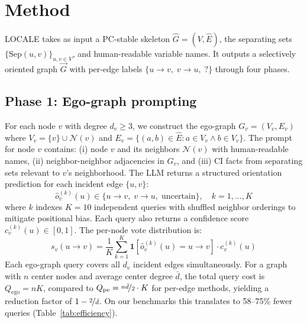 \documentclass{article}
\begin{document}
\section{Method}

LOCALE takes as input a PC-stable skeleton $\hat{G} = (V, \hat{E})$, the separating sets $\{\text{Sep}(u,v)\}_{u,v \in V}$, and human-readable variable names. It outputs a selectively oriented graph $\vec{G}$ with per-edge labels $\{u \to v, \; v \to u, \; ?\}$ through four phases.

\subsection{Phase 1: Ego-graph prompting}

For each node $v$ with degree $d_v \geq 3$, we construct the ego-graph $G_v = (V_v, E_v)$ where $V_v = \{v\} \cup \mathcal{N}(v)$ and $E_v = \{(a,b) \in \hat{E} : a \in V_v \wedge b \in V_v\}$. The prompt for node $v$ contains: (i) node $v$ and its neighbors $\mathcal{N}(v)$ with human-readable names, (ii) neighbor-neighbor adjacencies in $G_v$, and (iii) CI facts from separating sets relevant to $v$'s neighborhood. The LLM returns a structured orientation prediction for each incident edge $\{u, v\}$:
\begin{equation}
    \hat{o}_{v}^{(k)}(u) \in \{u \to v, \; v \to u, \; \text{uncertain}\}, \quad k = 1, \ldots, K
\end{equation}
where $k$ indexes $K{=}10$ independent queries with shuffled neighbor orderings to mitigate positional bias. Each query also returns a confidence score $c_{v}^{(k)}(u) \in [0,1]$. The per-node vote distribution is:
\begin{equation}
    s_v(u \to v) = \frac{1}{K} \sum_{k=1}^{K} \mathbf{1}[\hat{o}_{v}^{(k)}(u) = u \to v] \cdot c_{v}^{(k)}(u)
\end{equation}
Each ego-graph query covers all $d_v$ incident edges simultaneously. For a graph with $n$ center nodes and average center degree $\bar{d}$, the total query cost is $Q_{\text{ego}} = nK$, compared to $Q_{\text{pe}} = \nicefrac{n\bar{d}}{2} \cdot K$ for per-edge methods, yielding a reduction factor of $1 - \nicefrac{2}{\bar{d}}$. On our benchmarks this translates to 58--75\% fewer queries (Table~\ref{tab:efficiency}).
\end{document}
